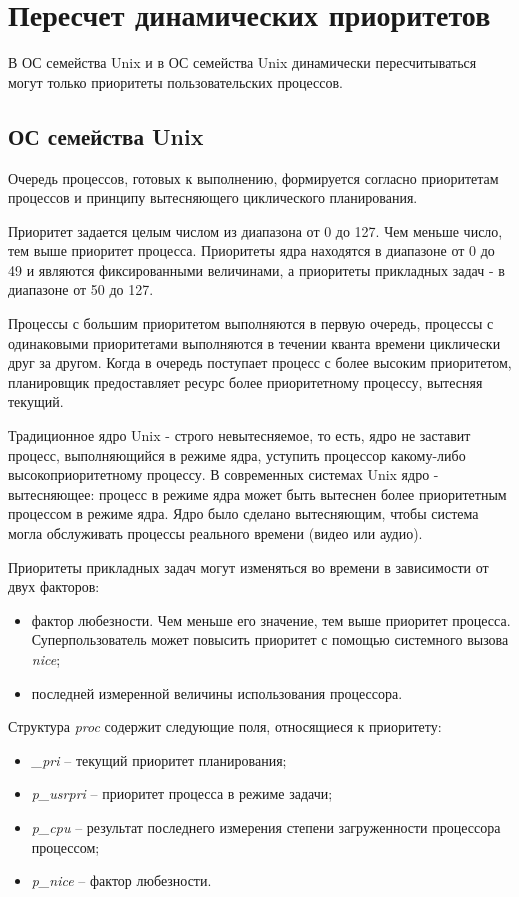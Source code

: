 \chapter{Пересчет динамических приоритетов}

В ОС семейства Unix и в ОС семейства Unix динамически пересчитываться могут только приоритеты пользовательских процессов.

\section{ОС семейства Unix}

Очередь процессов, готовых к выполнению, формируется согласно приоритетам процессов и принципу вытесняющего циклического планирования.

Приоритет задается целым числом из диапазона от 0 до 127. Чем меньше число, тем выше приоритет процесса. Приоритеты ядра находятся в диапазоне от 0 до 49 и являются фиксированными величинами, а приоритеты прикладных задач - в диапазоне от 50 до 127.

Процессы с большим приоритетом выполняются в первую очередь, процессы с одинаковыми приоритетами выполняются в течении кванта времени циклически друг за другом. Когда в очередь поступает процесс с более высоким приоритетом, планировщик предоставляет ресурс более приоритетному процессу, вытесняя текущий.

Традиционное ядро Unix - строго невытесняемое, то есть, ядро не заставит процесс, выполняющийся в режиме ядра, уступить процессор какому-либо высокоприоритетному процессу. В современных системах Unix ядро - вытесняющее: процесс в режиме ядра может быть вытеснен более приоритетным процессом в режиме ядра. Ядро было сделано вытесняющим, чтобы система могла обслуживать процессы реального времени (видео или аудио).

Приоритеты прикладных задач могут изменяться во времени в зависимости от двух факторов:

\begin{itemize}
	\item фактор любезности. Чем меньше его значение, тем выше приоритет процесса. Суперпользователь может повысить приоритет с помощью системного вызова \textit{nice};
	\item последней измеренной величины использования процессора.
\end{itemize}

Структура \textit{proc} содержит следующие поля, относящиеся к приоритету:
\begin{itemize}
    \item \textit{\_pri} – текущий приоритет планирования;
    \item \textit{p\_usrpri} – приоритет процесса в режиме задачи;
    \item \textit{p\_cpu} – результат последнего измерения степени загруженности процессора процессом;
    \item \textit{p\_nice} – фактор любезности.
\end{itemize}

